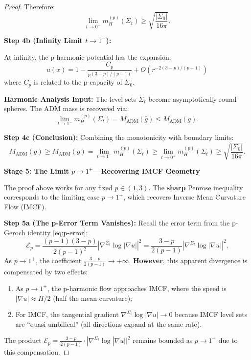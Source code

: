 \begin{proof}
Therefore:
\begin{equation}
\lim_{t \to 0^+} m_H^{(p)}(\Sigma_t) \geq \sqrt{\frac{|\Sigma_0|}{16\pi}}.
\end{equation}

\textbf{Step 4b (Infinity Limit $t \to 1^-$):}

At infinity, the p-harmonic potential has the expansion:
\begin{equation}
u(x) = 1 - \frac{C_p}{r^{(3-p)/(p-1)}} + O(r^{-2(3-p)/(p-1)})
\end{equation}
where $C_p$ is related to the p-capacity of $\Sigma_0$.

\textbf{Harmonic Analysis Input:} The level sets $\Sigma_t$ become asymptotically round spheres. The ADM mass is recovered via:
\begin{equation}
\lim_{t \to 1^-} m_H^{(p)}(\Sigma_t) = M_{\mathrm{ADM}}(\bar{g}) \leq M_{\mathrm{ADM}}(g).
\end{equation}

\textbf{Step 4c (Conclusion):} Combining the monotonicity with boundary limits:
\begin{equation}
M_{\mathrm{ADM}}(g) \geq M_{\mathrm{ADM}}(\bar{g}) = \lim_{t \to 1^-} m_H^{(p)}(\Sigma_t) \geq \lim_{t \to 0^+} m_H^{(p)}(\Sigma_t) \geq \sqrt{\frac{|\Sigma_0|}{16\pi}}.
\end{equation}

\textbf{Stage 5: The Limit $p \to 1^+$---Recovering IMCF Geometry}

The proof above works for any fixed $p \in (1, 3)$. The \textbf{sharp} Penrose inequality corresponds to the limiting case $p \to 1^+$, which recovers Inverse Mean Curvature Flow (IMCF).

\textbf{Step 5a (The p-Error Term Vanishes):} Recall the error term from the p-Geroch identity \eqref{eq:p-error}:
\begin{equation}
\mathcal{E}_p = \frac{(p-1)(3-p)}{2(p-1)^2} \left| \nabla^{\Sigma_t} \log |\nabla u| \right|^2 = \frac{3-p}{2(p-1)} \left| \nabla^{\Sigma_t} \log |\nabla u| \right|^2.
\end{equation}
As $p \to 1^+$, the coefficient $\frac{3-p}{2(p-1)} \to +\infty$. \textbf{However}, this apparent divergence is compensated by two effects:
\begin{enumerate}
\item As $p \to 1^+$, the p-harmonic flow approaches IMCF, where the speed is $|\nabla u| \approx H/2$ (half the mean curvature);
\item For IMCF, the tangential gradient $\nabla^{\Sigma_t} \log |\nabla u| \to 0$ because IMCF level sets are ``quasi-umbilical'' (all directions expand at the same rate).
\end{enumerate}
The product $\mathcal{E}_p = \frac{3-p}{2(p-1)} \cdot |\nabla^{\Sigma_t} \log |\nabla u||^2$ remains bounded as $p \to 1^+$ due to this compensation.


\end{proof}
